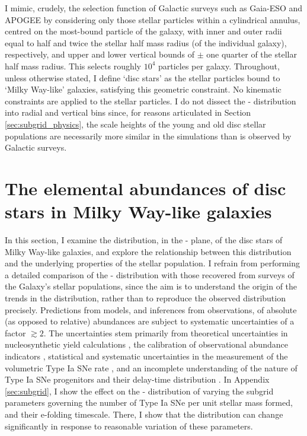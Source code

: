 I mimic, crudely, the selection function of Galactic surveys such as Gaia-ESO and APOGEE by considering only those stellar particles within a cylindrical annulus, centred on the most-bound particle of the galaxy, with inner and outer radii equal to half and twice the stellar half mass radius (of the individual galaxy), respectively, and upper and lower vertical bounds of $\pm$ one quarter of the stellar half mass radius. This selects roughly $10^4$ particles per galaxy. Throughout, unless otherwise stated, I define `disc stars' as the stellar particles bound to `Milky Way-like' galaxies, satisfying this geometric constraint. No kinematic constraints are applied to the stellar particles. I do not dissect the \afe{}-\feh{} distribution into radial and vertical bins since, for reasons articulated in Section \ref{sec:subgrid_physics}, the scale heights of the young and old disc stellar populations are necessarily more similar in the simulations than is observed by Galactic surveys. 

\section{The elemental abundances of disc stars in Milky Way-like galaxies}
\label{sec:z0_props}

In this section, I examine the distribution, in the \afe{}-\feh{} plane, of the disc stars of Milky Way-like galaxies, and explore the relationship between this distribution and the underlying properties of the stellar population. I refrain from performing a detailed comparison of the \afe{}-\feh{} distribution with those recovered from surveys of the Galaxy's stellar populations, since the aim is to understand the origin of the trends in the distribution, rather than to reproduce the observed distribution precisely. Predictions from models, and inferences from observations, of absolute (as opposed to relative) abundances are subject to systematic uncertainties of a factor $\gtrsim 2$. The uncertainties stem primarily from theoretical uncertainties in nucleosynthetic yield calculations \citep[see e.g. Appendix A of][and references therein]{2009MNRAS.399..574W}, the calibration of observational abundance indicators \citep[e.g.][]{2008ApJ...681.1183K}, statistical and systematic uncertainties in the measurement of the volumetric Type Ia SNe rate \citep[e.g.][]{2008ApJ...681..462D,2010ApJ...713.1026D,2014ApJ...783...28G}, and an incomplete understanding of the nature of Type Ia SNe progenitors and their delay-time distribution \citep[see, e.g.][]{2012NewAR..56..122W}. In Appendix \ref{sec:subgrid}, I show the effect on the \afe{}-\feh{} distribution of varying the subgrid parameters governing the number of Type Ia SNe per unit stellar mass formed, and their e-folding timescale. There, I show that the distribution can change significantly in response to reasonable variation of these parameters.

